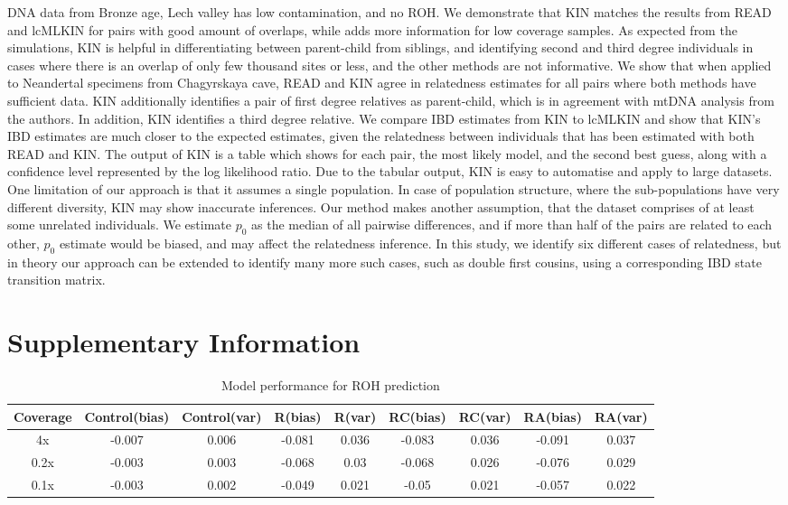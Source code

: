 \documentclass[12pt, letterpaper]{article}
\begin{document}
DNA data from Bronze age, Lech valley has low contamination, and no ROH. We demonstrate that KIN matches the results from READ and lcMLKIN for pairs with good amount of overlaps, while adds more information for low coverage samples. As expected from the simulations, KIN is helpful in differentiating between parent-child from siblings, and identifying second and third degree individuals in cases where there is an overlap of only few thousand sites or less, and the other methods are not informative. We show that when applied to Neandertal specimens from Chagyrskaya cave, READ and KIN agree in relatedness estimates for all pairs where both methods have sufficient data. KIN additionally identifies a pair of first degree relatives as parent-child, which is in agreement with mtDNA analysis from the authors. In addition, KIN identifies a third degree relative. We compare IBD estimates from KIN to lcMLKIN and show that KIN's IBD estimates are much closer to the expected estimates, given the relatedness between individuals that has been estimated with both READ and KIN. 
The output of KIN is a table which shows for each pair, the most likely model, and the second best guess, along with a confidence level represented by the log likelihood ratio. Due to the tabular output, KIN is easy to automatise and apply to large datasets. 
One limitation of our approach is that it assumes a single population. In case of population structure, where the sub-populations have very different diversity, KIN may show inaccurate inferences. Our method makes another assumption, that the dataset comprises of at least some unrelated individuals. We estimate $p_0$ as the median of all pairwise differences, and if more than half of the pairs are related to each other, $p_0$ estimate would be biased, and may affect the relatedness inference. In this study, we identify six different cases of relatedness, but in theory our approach can be extended to identify many more such cases, such as double first cousins, using a corresponding IBD state transition matrix.


\section{Supplementary Information}


\begin{table}
\caption{\label{tab:Table 2}Model performance for ROH prediction}
\begin{tabular}{|c|c|c|c|c|c|c|c|c|}
    \hline
    Coverage & Control(bias) & Control(var) & R(bias) & R(var) & RC(bias) & RC(var) & RA(bias) & RA(var)\\
    \hline
    4x & -0.007 & 0.006 & -0.081 & 0.036 & -0.083 & 0.036 & -0.091 & 0.037\\
    \hline
    0.2x & -0.003 & 0.003 & -0.068 & 0.03 & -0.068 & 0.026 & -0.076 & 0.029\\
    \hline
    0.1x & -0.003 & 0.002 & -0.049 & 0.021 & -0.05 & 0.021 & -0.057 & 0.022\\
    \hline
\end{tabular}
\label{table1}
\end{table}
\end{document}
